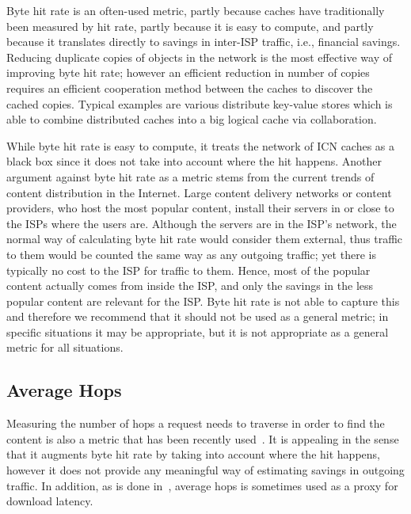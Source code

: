 \documentclass{sigcomm-alternate}
\begin{document}
Byte hit rate is an often-used metric, partly because caches have traditionally been measured by hit rate, partly because it is easy to compute, and partly because it translates directly to savings in inter-ISP traffic, i.e., financial savings.
Reducing duplicate copies of objects in the network is the most effective way of improving byte hit rate; however an efficient reduction in number of copies requires an efficient cooperation method between the caches to discover the cached copies. Typical examples are various distribute key-value stores \cite{maymounkov:kademlia, ratnasamy:can} which is able to combine distributed caches into a big logical cache via collaboration.


While byte hit rate is easy to compute, it treats the network of ICN caches as a black box since it does not take into account where the hit happens.
Another argument against byte hit rate as a metric stems from the current trends of content distribution in the Internet.
Large content delivery networks or content providers, who host the most popular content, install their servers in or close to the ISPs where the users are.
Although the servers are in the ISP's network, the normal way of calculating byte hit rate would consider them external, thus traffic to them would be counted the same way as any outgoing traffic; yet there is typically no cost to the ISP for traffic to them.
Hence, most of the popular content actually comes from inside the ISP, and only the savings in the less popular content are relevant for the ISP.
Byte hit rate is not able to capture this and therefore we recommend that it should not be used as a general metric; in specific situations it may be appropriate, but it is not appropriate as a general metric for all situations.

















\subsection{Average Hops}
\label{sec:average-hops}

Measuring the number of hops a request needs to traverse in order to find the content is also a metric that has been recently used~\cite{seyedicn2013}.
It is appealing in the sense that it augments byte hit rate by taking into account where the hit happens, however it does not provide any meaningful way of estimating savings in outgoing traffic.
In addition, as is done in~\cite{seyedicn2013}, average hops is sometimes used as a proxy for download latency.
\end{document}
